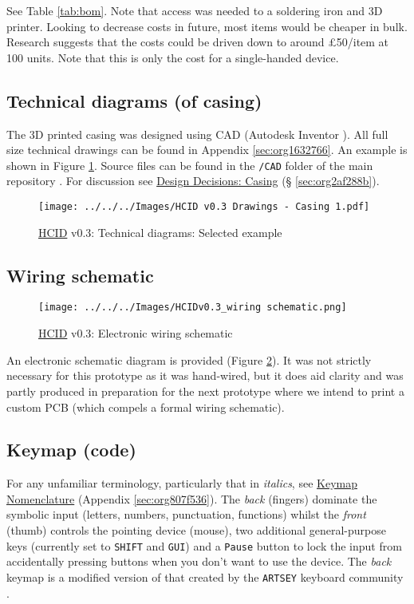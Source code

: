 \documentclass[logo,bsc,singlespacing,parskip]{infthesis}
\begin{document}
See Table \ref{tab:bom}.
Note that access was needed to a soldering iron and 3D printer.
Looking to decrease costs in future, most items would be cheaper in bulk.
Research suggests that the costs could be driven down to around £50/item at 100 units.
Note that this is only the cost for a single-handed device.
\subsection{Technical diagrams (of casing)}
\label{sec:orgbc636e5}
The 3D printed casing was designed using CAD (Autodesk Inventor \autocite{InventorSoftwareGet}).
All full size technical drawings can be found in Appendix \ref{sec:org1632766}.
An example is shown in Figure \ref{fig:tech_draw_ex}.
Source files can be found in the \texttt{/CAD} folder of the main repository \autocite{sharpNazzacodeHCIDMy}.
For discussion see \hyperref[sec:org2af288b]{Design Decisions: Casing} (§ \ref{sec:org2af288b}).

\begin{figure}[h]
\centering
\texttt{[image: ../../../Images/HCID v0.3 Drawings - Casing 1.pdf]}
\caption{\label{fig:tech_draw_ex}\hyperref[org0c83164]{HCID} v0.3: Technical diagrams: Selected example}
\end{figure}
\subsection{Wiring schematic}
\label{sec:org91570ae}
\begin{figure}[h]
\centering
\texttt{[image: ../../../Images/HCIDv0.3\_wiring schematic.png]}
\caption{\label{fig:wiring_schematic}\hyperref[org0c83164]{HCID} v0.3: Electronic wiring schematic}
\end{figure}

An electronic schematic diagram is provided (Figure \ref{fig:wiring_schematic}).
It was not strictly necessary for this prototype as it was hand-wired, but it does aid clarity and was partly produced in preparation for the next prototype where we intend to print a custom PCB (which compels a formal wiring schematic).
\subsection{Keymap (code)}
\label{sec:org29305bd}
For any unfamiliar terminology, particularly that in \emph{italics}, see \hyperref[sec:org807f536]{Keymap Nomenclature} (Appendix \ref{sec:org807f536}).
The \emph{back} (fingers) dominate the symbolic input (letters, numbers, punctuation, functions) whilst the \emph{front} (thumb) controls the pointing device (mouse), two additional general-purpose keys (currently set to \texttt{SHIFT} and \texttt{GUI}) and a \texttt{Pause} button to lock the input from accidentally pressing buttons when you don't want to use the device.
The \emph{back} keymap is a modified version of that created by the \texttt{ARTSEY} keyboard community \autocite{ARTSEYEasyFast}.
\end{document}
